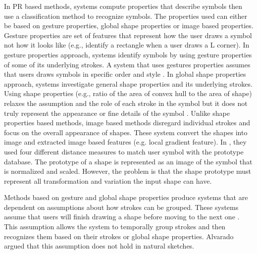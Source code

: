 \documentclass[preprint,10pt,5p,twocolumn]{elsarticle}
\begin{document}
In PR based methods, systems compute properties that describe symbols then use a classification method to recognize symbols. The properties used can either be based on gesture properties, global shape properties or image based properties. Gesture properties are set of features that represent how the user draws a symbol not how it looks like (e.g., identify a rectangle when a user draws a L corner). In gesture properties approach, systems identify symbols by using gesture properties of some of its underlying strokes. A system that uses gestures properties assumes that users draws symbols in specific order and style \cite{gestureexample12,aideddesgin22}. In global shape properties approach, systems investigate general shape properties and its underlying strokes. Using shape properties (e.g., ratio of the area of convex hull to the area of shape) relaxes the assumption and the role of each stroke in the symbol but it does not truly represent the appearance or fine details of the symbol \cite{DiagramOfflineConvexHull,Cali63}. Unlike shape properties based methods, image based methods disregard individual strokes and focus on the overall appearance of shapes. These system convert the shapes into image and extracted image based features (e.g. local gradient feature)\cite{Oltmans07,imagetrainable48}. In \cite{imagetrainable48}, they used four different distance measures to match user symbol with the prototype database. The prototype of a shape is represented as an image of the symbol that is normalized and scaled.  However, the problem is that the shape prototype must represent all transformation and variation the input shape can have.   %

Methods based on gesture and global shape properties produce systems that are dependent on assumptions about how strokes can be grouped. These systems assume that users will finish drawing a shape before moving to the next one \cite{Cali63,geometrydomain49}. This assumption allows the system to temporally group strokes and then recognizes them based on their strokes or global shape properties. Alvarado \cite{AlvaradoDigital} argued that this assumption does not hold in natural sketches. 
\end{document}
